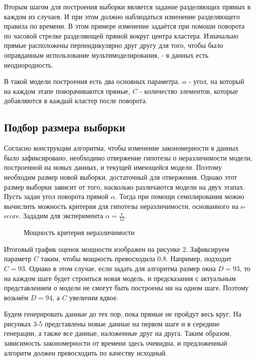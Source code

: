 \documentclass[12pt,twoside]{article}
\begin{document}
Вторым шагом для построения выборки является  задание разделяющих прямых в каждом из случаев. И при этом должно наблюдаться изменение разделяющего правила по времени. В этом примере изменение задаётся при помоши поворота по часовой стрелке разделяющей прямой вокруг центра кластера. Изначально прямые расположены перпендикулярно друг другу для того, чтобы было оправданным использование мультимоделирования, - в данных есть неоднородность.

В такой модели построения есть два основных параметра. $\alpha$ - угол, на который на каждом этапе поворачиваются прямые, $C$ - количество элементов, которые добавляются в каждый кластер после поворота. 

\subsection {Подбор размера выборки}

Согласно конструкции алгоритма, чтобы изменение закономерности в данных было зафиксировано, необходимо отвержение гипотезы о неразличимости модели, построенной на новых данных, и текущей имеющейся модели. Поэтому необходим размер новой выборки, достаточный для отвержения. Однако этот размер выборки зависит от того, насколько различаются модели на двух этапах. Пусть задан угол поворота прямой  $\alpha$. Тогда при помощи семплирования можно вычислить можность критерия для гипотезы неразличимости, основанного на s-score. Зададим для эксперимента $\alpha = \frac{\pi}{12}$.

\begin{figure}
        \caption{\label{fig:my-label} Мощность критерия неразличимости}
\end{figure}

Итоговый график оценок мощности изображен на рисунке 2. Зафиксируем параметр $C$ таким, чтобы мощность превосходила $0.8$. Например, подходит $C = 93$. Однако в этом случае, если задать для алгоритма размер окна $D = 93$, то на каждом шаге будет строиться новая модель, и предсказания с актуальным представлением о модели не смогут быть построены ни на одном шаге. Поэтому возьмём $D = 94$, а $C$ увеличим вдвое.

Будем генерировать данные до тех пор, пока прямые не пройдут весь круг. На рисунках 3-5 представлены новые данные на первом шаге и в середине генерации, а также все данные, наложенные друг на друга. Таким образом, зависимость закономерности от времени здесь очевидна, и предложенный алгоритм должен превосходить по качеству исходный.
\end{document}
